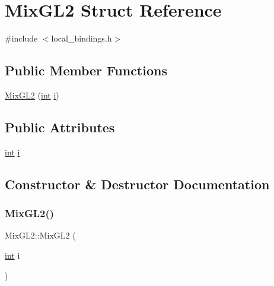 \hypertarget{struct_mix_g_l2}{}\section{Mix\+G\+L2 Struct Reference}
\label{struct_mix_g_l2}


{\ttfamily \#include $<$local\+\_\+bindings.\+h$>$}

\subsection*{Public Member Functions}
\begin{DoxyCompactItemize}
\item 
\mbox{\hyperlink{struct_mix_g_l2_a155dfca312149b3cef9dbd3537c70d6a}{Mix\+G\+L2}} (\mbox{\hyperlink{warnings_8h_a74f207b5aa4ba51c3a2ad59b219a423b}{int}} \mbox{\hyperlink{struct_mix_g_l2_aec3b0192e729604a75fe94a5f2d71989}{i}})
\end{DoxyCompactItemize}
\subsection*{Public Attributes}
\begin{DoxyCompactItemize}
\item 
\mbox{\hyperlink{warnings_8h_a74f207b5aa4ba51c3a2ad59b219a423b}{int}} \mbox{\hyperlink{struct_mix_g_l2_aec3b0192e729604a75fe94a5f2d71989}{i}}
\end{DoxyCompactItemize}


\subsection{Constructor \& Destructor Documentation}
\mbox{\label{struct_mix_g_l2_a155dfca312149b3cef9dbd3537c70d6a}} 
\subsubsection{\texorpdfstring{MixGL2()}{MixGL2()}}
{\footnotesize\ttfamily Mix\+G\+L2\+::\+Mix\+G\+L2 (\begin{DoxyParamCaption}\item[{\mbox{\hyperlink{warnings_8h_a74f207b5aa4ba51c3a2ad59b219a423b}{int}}}]{i }\end{DoxyParamCaption})\hspace{0.3cm}{\ttfamily [inline]}}




